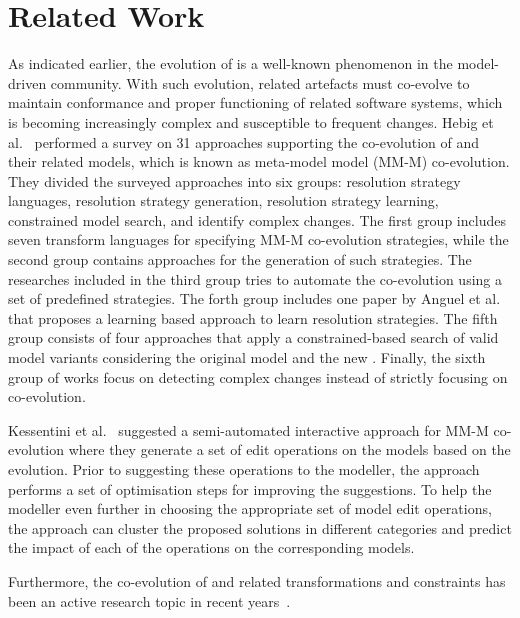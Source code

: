 \section{Related Work} \label{sec:RW}

As indicated earlier, the evolution of \metamodels is a well-known phenomenon in the model-driven community. With such evolution, related artefacts must co-evolve to maintain conformance and proper functioning of related software systems, which is becoming increasingly complex and susceptible to frequent changes. Hebig et al.~\autocite{Hebig2017} performed a survey on 31 approaches supporting the co-evolution of \metamodels and their related models, which is known as meta-model model (MM-M) co-evolution. They divided the surveyed approaches into six groups: resolution strategy languages, resolution strategy generation, resolution strategy learning, constrained model search, and identify complex changes. The first group includes seven transform languages for specifying MM-M co-evolution strategies, while the second group contains approaches for the generation of such strategies. The researches included in the third group tries to automate the co-evolution using a set of predefined strategies. The forth group includes one paper by Anguel et al.~\autocite{Anguel2013} that proposes a learning based approach to learn resolution strategies. The fifth group consists of four approaches that apply a constrained-based search of valid model variants considering the original model and the new \metamodel. Finally, the sixth group of works focus on detecting complex \metamodel changes instead of strictly focusing on co-evolution.

Kessentini et al.~\autocite{Kessentini2022} suggested a semi-automated interactive approach for MM-M co-evolution where they generate a set of edit operations on the models based on the \metamodel evolution. Prior to suggesting these operations to the modeller, the approach performs a set of optimisation steps for improving the suggestions. To help the modeller even further in choosing the appropriate set of model edit operations, the approach can cluster the proposed solutions in different categories and predict the impact of each of the operations on the corresponding models.

Furthermore, the co-evolution of \metamodel and related transformations and constraints has been an active research topic in recent years~\autocite{Kusel2015, Khelladi2017, garcia2013}.

